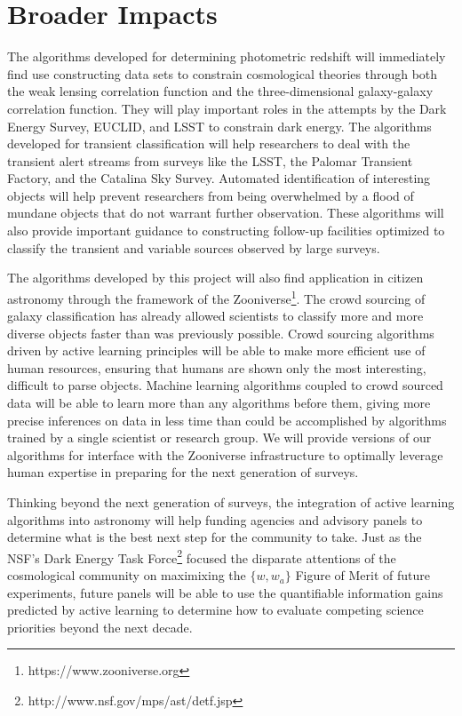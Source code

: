 \documentclass[prd, nofootinbib, floatfix, 12pt,tightenlines]{revtex4}
\begin{document}
\section{Broader Impacts}
\label{sec:broad}

The algorithms developed for determining photometric redshift will immediately
find use constructing data sets to constrain cosmological theories through both
the weak lensing correlation function and the three-dimensional galaxy-galaxy
correlation function.  
They will play important roles in the attempts by 
the Dark Energy Survey, EUCLID, and LSST to constrain dark energy.
The algorithms developed for transient classification
will help researchers to deal with the transient alert streams from surveys like
the LSST, the Palomar Transient Factory, and the Catalina Sky Survey.  
Automated identification of
interesting objects will help prevent researchers from being overwhelmed by a
flood of mundane objects that do not warrant further observation.
These algorithms will also provide important guidance to constructing follow-up
facilities optimized to classify the transient and variable sources observed by
large surveys.

The algorithms developed by this project will also 
find application in citizen astronomy through the framework
of the Zooniverse\footnote{https://www.zooniverse.org}.  
The crowd sourcing of galaxy
classification has already allowed
scientists to classify more and more diverse objects faster than was
previously possible.  
Crowd sourcing algorithms driven by active learning principles will be
able to make more efficient use of human resources, ensuring that humans are
shown only the most interesting, difficult to parse objects.  Machine learning
algorithms coupled to crowd sourced data will be able to learn more than any
algorithms before them, giving more precise inferences on data in less time than
could be accomplished by algorithms trained by a single scientist or research
group.  We will provide versions of our algorithms for interface with the
Zooniverse infrastructure to optimally leverage human expertise in preparing for
the next generation of surveys.

Thinking beyond the next generation of surveys, the integration of active
learning algorithms into astronomy will help funding agencies and advisory
panels to determine what is the best next step for the community to take.  Just
as the NSF's Dark Energy Task
Force\footnote{http://www.nsf.gov/mps/ast/detf.jsp} focused the disparate
attentions of the cosmological community on maximixing the $\{w,w_a\}$ Figure of
Merit of future experiments, future panels will be able to use the quantifiable
information gains predicted by active learning to determine how to evaluate
competing science priorities beyond the next decade.
\end{document}
